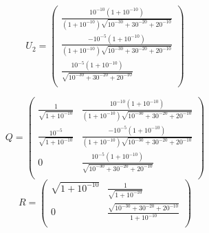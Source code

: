 \begin{enumerate}
    $$U_{2} =\left( {\begin{array}{c}
                \frac{10^{-10}(1+10^{-10})}{(1+10^{-10})\sqrt{10^{-30}+30^{-20}+20^{-10}}}\\
                \frac{-10^{-5}(1+10^{-10})}{(1+10^{-10})\sqrt{10^{-30}+30^{-20}+20^{-10}}}\\
                \frac{10^{-5}(1+10^{-10})}{\sqrt{10^{-30}+30^{-20}+20^{-10}}} \\
            \end{array} } \right)$$
            
    \[
        Q =
            \left( {\begin{array}{cc}
                \frac{1}{\sqrt{1+10^{-10}}} & \frac{10^{-10}(1+10^{-10})}{(1+10^{-10})\sqrt{10^{-30}+30^{-20}+20^{-10}}}\\
                \frac{10^{-5}}{\sqrt{1+10^{-10}}} & \frac{-10^{-5}(1+10^{-10})}{(1+10^{-10})\sqrt{10^{-30}+30^{-20}+20^{-10}}}\\
                0 & \frac{10^{-5}(1+10^{-10})}{\sqrt{10^{-30}+30^{-20}+20^{-10}}}\\
            \end{array} } \right)
        \]
    \[
        R =
            \left( {\begin{array}{cc}
                \sqrt{1+10^{-10}} & \frac{1}{\sqrt{1+10^{-10}}}\\
                0 & \frac{\sqrt{10^{-30}+30^{-20}+20^{-10}}}{1+10^{-10}}\\
            \end{array} } \right)
        \]
        
\end{enumerate}